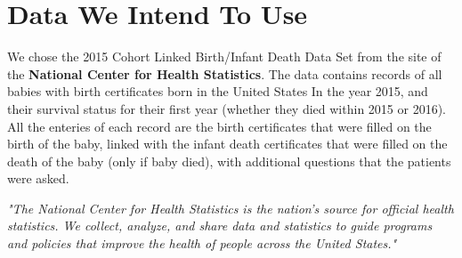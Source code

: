 \documentclass[a4paper,12pt]{article} %
\begin{document}
\section{Data We Intend To Use}
We chose the 2015 Cohort Linked Birth/Infant Death Data Set from the site of the \textbf{National Center for Health Statistics}.
The data contains records of all babies with birth certificates born in the United States In the year 2015, and their survival status for their first year (whether they died within 2015 or 2016).
All the enteries of each record are the birth certificates that were filled on the birth of the baby, linked with the infant death certificates that were filled on the death of the baby (only if baby died), with additional questions that the patients were asked. \newline
\begin{center}
\textit{"The National Center for Health Statistics is the nation's source for official health statistics. We collect, analyze, and share data and statistics to guide programs and policies that improve the health of people across the United States."}
\end{center}
\end{document}
